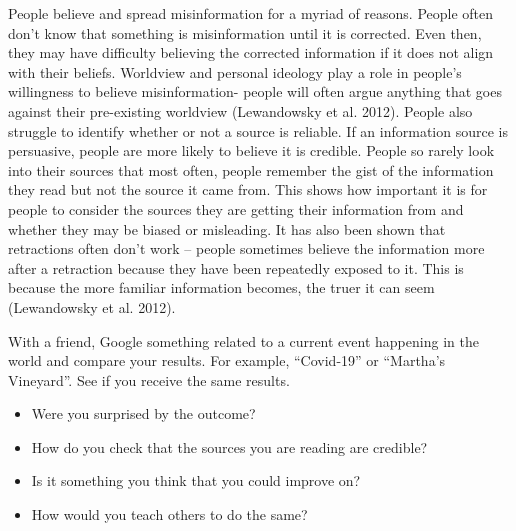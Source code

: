 \documentclass[
  letterpaper,
  DIV=11,
  numbers=noendperiod]{scrreprt}
\begin{document}
People believe and spread misinformation for a myriad of reasons. People
often don't know that something is misinformation until it is corrected.
Even then, they may have difficulty believing the corrected information
if it does not align with their beliefs. Worldview and personal ideology
play a role in people's willingness to believe misinformation- people
will often argue anything that goes against their pre-existing worldview
(Lewandowsky et al. 2012). People also struggle to identify whether or
not a source is reliable. If an information source is persuasive, people
are more likely to believe it is credible. People so rarely look into
their sources that most often, people remember the gist of the
information they read but not the source it came from. This shows how
important it is for people to consider the sources they are getting
their information from and whether they may be biased or misleading. It
has also been shown that retractions often don't work -- people
sometimes believe the information more after a retraction because they
have been repeatedly exposed to it. This is because the more familiar
information becomes, the truer it can seem (Lewandowsky et al. 2012).

\begin{tcolorbox}[enhanced jigsaw, arc=.35mm, bottomrule=.15mm, bottomtitle=1mm, breakable, colback=white, colbacktitle=quarto-callout-tip-color!10!white, colframe=quarto-callout-tip-color-frame, coltitle=black, left=2mm, leftrule=.75mm, opacityback=0, opacitybacktitle=0.6, rightrule=.15mm, title=\textcolor{quarto-callout-tip-color}{\faLightbulb}\hspace{0.5em}{Pause and Reflect}, titlerule=0mm, toprule=.15mm, toptitle=1mm]

With a friend, Google something related to a current event happening in
the world and compare your results. For example, ``Covid-19'' or
``Martha's Vineyard''. See if you receive the same results.

\begin{itemize}
\item
  Were you surprised by the outcome?
\item
  How do you check that the sources you are reading are credible?
\item
  Is it something you think that you could improve on?
\item
  How would you teach others to do the same?
\end{itemize}

\end{tcolorbox}
\end{document}
